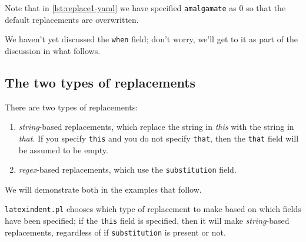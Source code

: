 	Note that in \cref{lst:replace1-yaml} we have specified \texttt{amalgamate} as 0 so
	that the default replacements are overwritten.

	We haven't yet discussed the \texttt{when} field; don't worry, we'll get to it
	as part of the discussion in what follows.

\subsection{The two types of replacements}
	There are two types of replacements:
	\begin{enumerate}
		\item \emph{string}-based replacements, which replace the string in
		      \emph{this} with the string in \emph{that}.
		      If you specify \texttt{this} and you do not specify \texttt{that}, then
		      the \texttt{that} field will be assumed to be empty.
		\item \emph{regex}-based replacements, which use the \texttt{substitution} field.
	\end{enumerate}
	We will demonstrate both in the examples that follow.

	\texttt{latexindent.pl} chooses which type of replacement to make based on which fields
	have been specified; if the \texttt{this} field is specified, then it will make
	\emph{string}-based replacements, regardless of if \texttt{substitution} is
	present or not.

